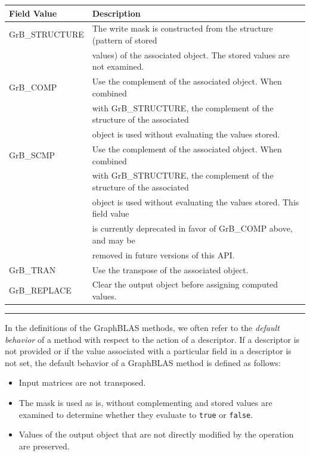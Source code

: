 \begin{table}
\begin{center}
\begin{tabular}{l|l}
Field Value          & Description \\ \hline
{\sf GrB\_STRUCTURE} &  The write mask is constructed from the structure (pattern of stored \\
                     &  values) of the associated object. The stored values are not examined.\\
{\sf GrB\_COMP}      &  Use the complement of the associated object. When combined \\ 
                     &  with {\sf GrB\_STRUCTURE}, the complement of the structure of the associated \\
                     &  object is used without evaluating the values stored.\\
{\sf GrB\_SCMP}      &  Use the complement of the associated object. When combined \\ 
                     &  with {\sf GrB\_STRUCTURE}, the complement of the structure of the associated \\
             &  object is used without evaluating the values stored. {\color{red} This field value} \\
		     &  {\color{red} is currently deprecated in favor of {\sf GrB\_COMP} above, and may be} \\
		     &  {\color{red} removed in future versions of this API.} \\
{\sf GrB\_TRAN}      &  Use the transpose of the associated object.\\
{\sf GrB\_REPLACE}   &  Clear the output object before assigning computed values.\\
\end{tabular}
\end{center}
\hrule
\end{table}

In the definitions of the GraphBLAS methods, we often refer to the
\emph{default behavior} of a method with respect to the action of a
descriptor.   If a descriptor is not provided or if the value associated
with a particular field in a descriptor is not set, the default behavior
of a GraphBLAS method is defined as follows:
\begin{itemize}
\item Input matrices are not transposed.
\item The mask is used as is, without complementing and stored values are examined to 
determine whether they evaluate to {\tt true} or {\tt false}.

\item Values of the output object that are not directly modified by the operation are preserved.
\end{itemize}

